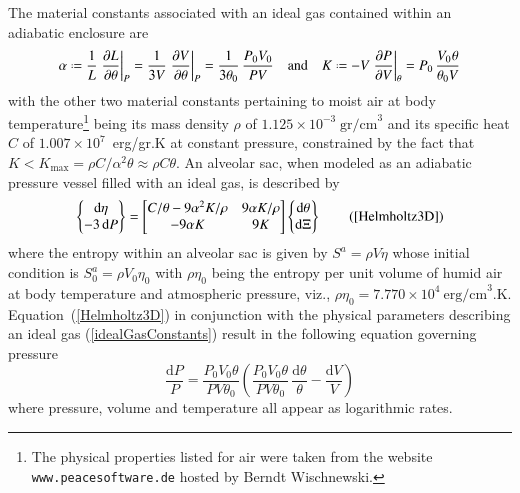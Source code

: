 The material constants associated with an ideal gas contained within an adiabatic enclosure are
\begin{equation}
\alpha \defeq \frac{1}{L} \left. \frac{\partial L}{\partial \theta} \right|_P =
\frac{1}{3V} \left. \frac{\partial V}{\partial \theta} \right|_P = 
\frac{1}{3\theta_0} \, \frac{P_0 V_0}{P V}
\quad \text{and} \quad
K \defeq -V \left. \frac{\partial P}{\partial V} \right|_{\theta} = 
P_0 \, \frac{V_0 \hspace{0.5pt} \theta}{\theta_0 V}
\label{idealGasConstants}
\end{equation}
with the other two material constants pertaining to moist air at body temperature\footnote{
    The physical properties listed for air were taken from the website \texttt{www.peacesoftware.de} hosted by Berndt Wischnewski.
}
being its mass density $\rho$ of $1.125 \times 10^{-3} \; \text{gr/cm}^3$ and its specific heat $C$ of $1.007 \times 10^7$~erg/gr.K at constant pressure, constrained by the fact that $K < K_{\max} = \rho C / \alpha^2 \theta \approx \rho C \theta$.  An alveolar sac, when modeled as an adiabatic pressure vessel filled with an ideal gas, is described by
\begin{equation}
\left\{ \begin{matrix}
    \mathrm{d} \eta \\ -3 \, \mathrm{d} P
\end{matrix} \right\} = \begin{bmatrix}
    C / \theta - 9 \alpha^2 K / \rho & 
    9 \alpha K / \rho \\
    -9 \alpha K & 9 K
\end{bmatrix} \left\{ \begin{matrix}
    \mathrm{d} \theta \\ \mathrm{d} \Xi
\end{matrix} \right\}
\tag{\ref{Helmholtz3D}}
\end{equation}
where the entropy within an alveolar sac is given by $S^a = \rho V \eta$ whose initial condition is $S^a_0 = \rho V_0 \eta_0$ with $\rho \eta_0$ being the entropy per unit volume of humid air at body temperature and atmospheric pressure, viz., $\rho \eta_0 = 7.770 \times 10^4 \: \text{erg/cm}^3\text{.K}$.  Equation~(\ref{Helmholtz3D}) in conjunction with the physical parameters describing an ideal gas (\ref{idealGasConstants}) result in the following equation governing pressure
\begin{displaymath}
\frac{\mathrm{d} P}{P} = \frac{P_0 V_0 \theta}{P V \theta_0} \left( 
\frac{P_0 V_0 \theta}{P V \theta_0} \, \frac{\mathrm{d} \theta}{\theta} - 
\frac{\mathrm{d} V}{V} \right)
\end{displaymath}
where pressure, volume and temperature all appear as logarithmic rates.

